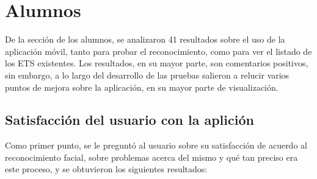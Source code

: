 \section{Alumnos}
De la sección de los alumnos, se analizaron 41 resultados sobre el uso de la aplicación móvil, tanto para probar el reconocimiento, como para ver el listado de los ETS existentes. 
Los resultados, en su mayor parte, son comentarios positivos, sin embargo, a lo largo del desarrollo de las pruebas salieron a relucir varios puntos de mejora sobre la aplicación, en su mayor parte de visualización.

\subsection{Satisfacción del usuario con la aplición}
Como primer punto, se le preguntó al usuario sobre su satisfacción de acuerdo al reconocimiento facial, sobre problemas acerca del mismo y qué tan preciso era este proceso, y se obtuvieron los siguientes resultados:
\newpage

